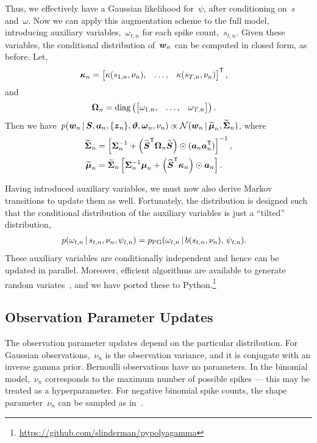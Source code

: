 Thus, we effectively have a Gaussian likelihood for~$\psi$, after conditioning 
on~$s$ and~$\omega$. Now we can apply this augmentation scheme to the full
model, introducing auxiliary variables,~$\omega_{t,n}$ for each spike count,~$s_{t,n}$.
Given these variables, the conditional distribution of~$\boldsymbol{w}_n$ can be computed in closed form,
as before. Let,
\begin{align*}
  \boldsymbol{\kappa}_n
  &= \begin{bmatrix} \kappa(s_{1,n}, \nu_n), &\ldots, &\kappa(s_{T,n}, \nu_n)
  \end{bmatrix}^{\mathsf{T}},
\end{align*}
and
\begin{align*}
  \boldsymbol{\Omega}_n &= \mathrm{diag} \left(
  \begin{bmatrix}
    \omega_{1,n}, & \ldots, & \omega_{T,n}
  \end{bmatrix}
  \right).
\end{align*}
Then we have~$
  p(\boldsymbol{w}_n \,|\, \boldsymbol{S}, \boldsymbol{a}_n, \{\boldsymbol{z}_n\}, \boldsymbol{\vartheta}, \boldsymbol{\omega}_n, \nu_n)
  \propto \mathcal{N}(\boldsymbol{w}_n \,|\, \widetilde{\boldsymbol{\mu}}_n, \widetilde{\boldsymbol{\Sigma}}_n)$,
where
\begin{align*}
  \widetilde{\boldsymbol{\Sigma}}_n &= \left[ \boldsymbol{\Sigma}_n^{-1} +
  \left(\widehat{\boldsymbol{S}}^{\mathsf{T}} \boldsymbol{\Omega}_n \widehat{\boldsymbol{S}} \right) \odot (\boldsymbol{a}_n \boldsymbol{a}_n^{\mathsf{T}}) \right]^{-1}, \\
  \widetilde{\boldsymbol{\mu}}_n &= \widetilde{\boldsymbol{\Sigma}}_n \left[ \boldsymbol{\Sigma}_n^{-1} \boldsymbol{\mu}_n +
  \left(\widehat{\boldsymbol{S}}^{\mathsf{T}} \boldsymbol{\kappa}_n \right) \odot \boldsymbol{a}_n \right].
\end{align*}

Having introduced auxiliary variables, we must now also derive
Markov transitions to update them as well. Fortunately, the
\polyagamma distribution is designed such that the conditional
distribution of the auxiliary variables is just a ``tilted'' \polyagamma
distribution,
\begin{align*}
  p(\omega_{t,n} \,|\, s_{t,n}, \nu_n, \psi_{t,n})
  &= p_{\mathrm{PG}}(\omega_{t,n} \,|\, b(s_{t,n}, \nu_n), \, \psi_{t,n}).
\end{align*}
These auxiliary variables are conditionally independent and hence can
be updated in parallel. Moreover, efficient algorithms are available
to generate \polyagamma random variates~\citep{windle2014sampling}, and
we have ported these to Python.\footnote{\url{https://github.com/slinderman/pypolyagamma}}

\subsection{Observation Parameter Updates}
The observation parameter updates depend on the particular distribution.
For Gaussian observations,~$\nu_n$ is the observation variance, and
it is conjugate with an inverse gamma prior.
Bernoulli observations have no parameters.
In the binomial model,~$\nu_n$ corresponds to the maximum number of
possible spikes --- this may be treated as a hyperparameter.
For negative binomial spike counts, the shape parameter~$\nu_n$ can
be sampled as in~\citep{Zhou2012}.



